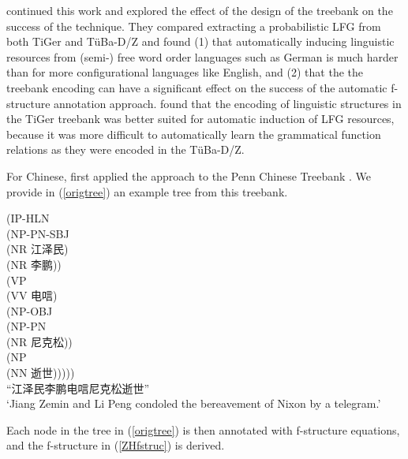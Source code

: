 \documentclass[output=paper,hidelinks]{langscibook}
\begin{document}
\citet{RehbeinAutomatic:lfg09} continued this work and explored the effect of the design of the treebank on the success of the technique. They compared extracting a probabilistic LFG from both TiGer and T{\"u}Ba-D/Z \citep{telljohann2006stylebook} and found (1) that automatically inducing linguistic resources from (semi-) free word order languages such as German is much harder than for more configurational languages like English, and (2) that the the treebank encoding can have a significant effect on the success of the automatic f-structure annotation approach. \citet{RehbeinAutomatic:lfg09} found that the encoding of linguistic structures in the TiGer treebank was better suited for automatic induction of LFG resources, because it was more difficult to automatically learn the grammatical function relations as they were encoded in the T{\"u}Ba-D/Z.

For Chinese, \citet{burke-etal-2004-treebank} first applied the approach to the Penn Chinese Treebank \citep{xue-etal-2002-building}. We provide in (\ref{origtree}) an example tree from this treebank. 

\ea
\label{origtree}
(IP-HLN\\
\hspace*{2em}   (NP-PN-SBJ\\
\hspace*{4em}      (NR {\cn 江泽民})\\
\hspace*{4em}      (NR {\cn 李鹏}))\\
\hspace*{2em}   (VP\\
\hspace*{4em}      (VV {\cn 电唁})\\
\hspace*{4em}      (NP-OBJ\\
\hspace*{6em}           (NP-PN\\
\hspace*{8em}                (NR {\cn 尼克松}))\\
\hspace*{6em}           (NP\\
\hspace*{8em}                (NN {\cn 逝世})))))\\
{\cn “江泽民李鹏电唁尼克松逝世”}\\
`Jiang Zemin and Li Peng condoled the bereavement of Nixon by a telegram.'
\z

Each node in the tree in (\ref{origtree}) is then annotated with f-structure equations, and the f-structure in (\ref{ZHfstruc}) is derived.
\end{document}
